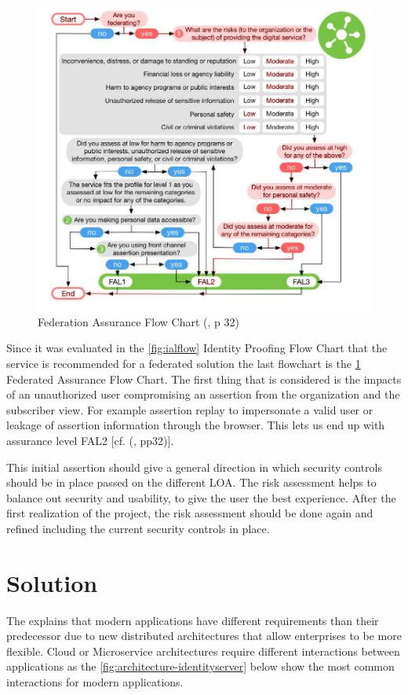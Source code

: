 \begin{figure}[h]
	\centering
	\includegraphics[width=0.9\linewidth]{images/fal_flow}
	\caption{Federation Assurance Flow Chart (\cite{NIST:2017:DIG}, p 32)}
	\label{fig:falflow}
\end{figure}

Since it was evaluated in the \ref{fig:ialflow} Identity Proofing Flow Chart that the service is recommended for a federated solution the last flowchart is the \ref{fig:falflow} Federated Assurance Flow Chart. The first thing that is considered is the impacts of an unauthorized user compromising an assertion from the organization and the subscriber view. For example assertion replay to impersonate a valid user or leakage of assertion information through the browser. This lets us end up with assurance level FAL2 [cf. (\cite{NIST:2017:DIG}, pp32)]. 


This initial assertion should give a general direction in which security controls should be in place passed on the different LOA. The risk assessment helps to balance out security and usability, to give the user the best experience. After the first realization of the project, the risk assessment should be done again and refined including the current security controls in place.
 



\section{Solution}
The \cite{Sakimura:2014:OpenIDConnect} explains that modern applications have different requirements than their predecessor due to new distributed architectures that allow enterprises to be more flexible. Cloud or Microservice architectures require different interactions between applications as the \ref{fig:architecture-identityserver} below show the most common interactions for modern applications.

